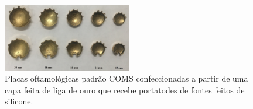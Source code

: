 \documentclass[11pt,a4paper]{article}
\begin{document}
            \begin{figure}[h]
                \centering
                \includegraphics[width=0.5\textwidth]{Imagens/aplicadorCOMS.JPG}
                \caption{Placas oftamológicas padrão COMS confeccionadas a partir de uma capa feita de liga de ouro que recebe portatodes de fontes feitos de silicone.}
            \end{figure}

\pagebreak
  
\end{document}
